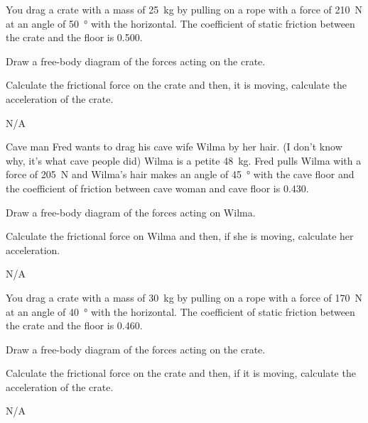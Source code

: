 \begin{question}[ID=friction-C-Q02,topic=friction,difficulty=C]
    You drag a crate with a mass of \SI{25}{\kilo\gram} by pulling
        on a rope with a force of \SI{210}{\newton} at an angle of
        \SI{50}{\degree} with the horizontal.
    The coefficient of static friction between the crate and the
        floor is \num{0.500}.
    \begin{enumerate*}[label=\arabic*)]
        \item Draw a free-body diagram of the forces acting on the crate.
        \item Calculate the frictional force on the crate and then, it
            is moving, calculate the acceleration of the crate.
    \end{enumerate*}
\end{question}
\begin{solution}
    N/A
\end{solution}


\begin{question}[ID=friction-C-Q03,topic=friction,difficulty=C]
    Cave man Fred wants to drag his cave wife Wilma by her hair.
    (I don't know why, it's what cave people did)
    Wilma is a petite \SI{48}{\kilo\gram}.
    Fred pulls Wilma with a force of \SI{205}{\newton} and Wilma's
        hair makes an angle of \SI{45}{\degree} with the cave
        floor and the coefficient of friction between cave woman
        and cave floor is \num{0.430}.
    \begin{enumerate*}[label=\arabic*)]
        \item Draw a free-body diagram of the forces acting on Wilma.
        \item Calculate the frictional force on Wilma and then,
            if she is moving, calculate her acceleration.
    \end{enumerate*}
\end{question}
\begin{solution}
    N/A
\end{solution}


\begin{question}[ID=friction-C-Q04,topic=friction,difficulty=C]
    You drag a crate with a mass of \SI{30}{\kilo\gram} by pulling
        on a rope with a force of \SI{170}{\newton} at an angle
        of \SI{40}{\degree} with the horizontal.
    The coefficient of static friction between the crate and the
        floor is \num{0.460}.
    \begin{enumerate*}[label=\arabic*)]
        \item Draw a free-body diagram of the forces acting on the crate.
        \item Calculate the frictional force on the crate and then,
            if it is moving, calculate the acceleration of the crate.
    \end{enumerate*}
\end{question}
\begin{solution}
    N/A
\end{solution}


\endinput

